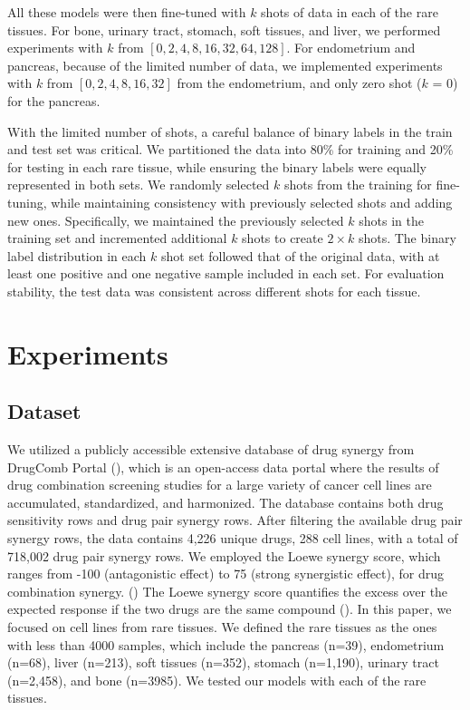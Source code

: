 All these models were then fine-tuned with $k$ shots of data in each of the rare tissues. For bone, urinary tract, stomach, soft tissues, and liver, we performed experiments with $k$ from $[0, 2, 4, 8, 16, 32, 64, 128]$. For endometrium and pancreas, because of the limited number of data, we implemented experiments with $k$ from $[0, 2, 4, 8, 16, 32]$ from the endometrium, and only zero shot ($k$ = 0) for the pancreas.

With the limited number of shots, a careful balance of binary labels in the train and test set was critical. We partitioned the data into 80\% for training and 20\% for testing in each rare tissue, while ensuring the binary labels were equally represented in both sets. We randomly selected $k$ shots from the training for fine-tuning, while maintaining consistency with previously selected shots and adding new ones. Specifically, we maintained the previously selected $k$ shots in the training set and incremented additional $k$ shots to create $2 \times k$ shots. The binary label distribution in each $k$ shot set followed that of the original data, with at least one positive and one negative sample included in each set. For evaluation stability, the test data was consistent across different shots for each tissue. 

\section{Experiments}
\label{sec:experiments}

\subsection{Dataset}
We utilized a publicly accessible extensive database of drug synergy from DrugComb Portal (\cite{zagidullin_drugcomb_2019}), which is an open-access data portal where the results of drug combination screening studies for a large variety of cancer cell lines are accumulated, standardized, and harmonized. The database contains both drug sensitivity rows and drug pair synergy rows. After filtering the available drug pair synergy rows, the data contains 4,226 unique drugs, 288 cell lines, with a total of 718,002 drug pair synergy rows. We employed the Loewe synergy score, which ranges from -100 (antagonistic effect) to 75 (strong synergistic effect), for drug combination synergy. (\cite{greco_search_1995})  The Loewe synergy score quantifies the excess over the expected response if the two drugs are the same compound (\cite{ianevski_synergyfinder_2017, yadav_searching_2015}). In this paper, we focused on cell lines from rare tissues. We defined the rare tissues as the ones with less than 4000 samples, which include the pancreas (n=39), endometrium (n=68), liver (n=213), soft tissues (n=352), stomach (n=1,190), urinary tract (n=2,458), and bone (n=3985). We tested our models with each of the rare tissues. 

